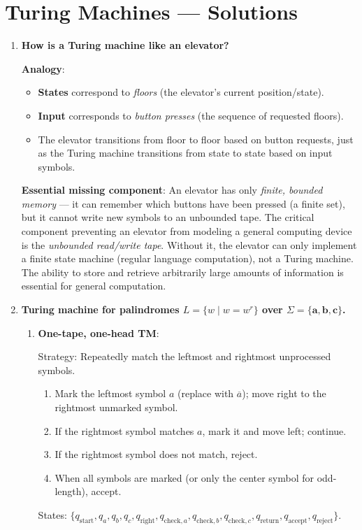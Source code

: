 
\chapter{Turing Machines --- Solutions}

\begin{enumerate}[{11.}1. ]

\item \textbf{How is a Turing machine like an elevator?}

\textbf{Analogy}:
\begin{itemize}
\item \textbf{States} correspond to \emph{floors} (the elevator's current position/state).
\item \textbf{Input} corresponds to \emph{button presses} (the sequence of requested floors).
\item The elevator transitions from floor to floor based on button requests, just as the Turing machine transitions from state to state based on input symbols.
\end{itemize}

\textbf{Essential missing component}: An elevator has only \emph{finite, bounded memory} --- it can remember which buttons have been pressed (a finite set), but it cannot write new symbols to an unbounded tape. The critical component preventing an elevator from modeling a general computing device is the \emph{unbounded read/write tape}. Without it, the elevator can only implement a finite state machine (regular language computation), not a Turing machine. The ability to store and retrieve arbitrarily large amounts of information is essential for general computation.

\item \textbf{Turing machine for palindromes $L = \{w \mid w = w^r\}$ over $\Sigma=\{\pmb{a},\pmb{b},\pmb{c}\}$.}

\begin{enumerate}
\item \textbf{One-tape, one-head TM}:

Strategy: Repeatedly match the leftmost and rightmost unprocessed symbols.
\begin{enumerate}[1.]
\item Mark the leftmost symbol $a$ (replace with $\overline{a}$); move right to the rightmost unmarked symbol.
\item If the rightmost symbol matches $a$, mark it and move left; continue.
\item If the rightmost symbol does not match, reject.
\item When all symbols are marked (or only the center symbol for odd-length), accept.
\end{enumerate}
States: $\{q_\text{start}, q_a, q_b, q_c, q_\text{right}, q_{\text{check},a}, q_{\text{check},b}, q_{\text{check},c}, q_\text{return}, q_\text{accept}, q_\text{reject}\}$.


\end{enumerate}
\end{enumerate}
